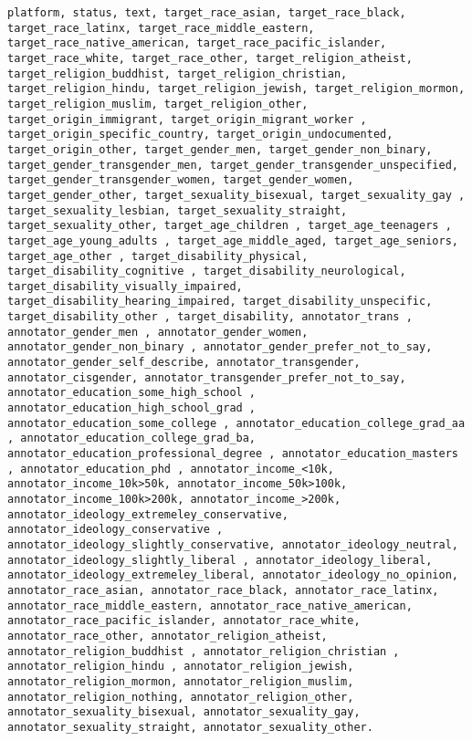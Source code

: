 \documentclass[
]{article}
\begin{document}
\begin{verbatim}
platform, status, text, target_race_asian, target_race_black, target_race_latinx, target_race_middle_eastern, target_race_native_american, target_race_pacific_islander, target_race_white, target_race_other, target_religion_atheist, target_religion_buddhist, target_religion_christian, target_religion_hindu, target_religion_jewish, target_religion_mormon, target_religion_muslim, target_religion_other, target_origin_immigrant, target_origin_migrant_worker , target_origin_specific_country, target_origin_undocumented, target_origin_other, target_gender_men, target_gender_non_binary, target_gender_transgender_men, target_gender_transgender_unspecified, target_gender_transgender_women, target_gender_women, target_gender_other, target_sexuality_bisexual, target_sexuality_gay , target_sexuality_lesbian, target_sexuality_straight, target_sexuality_other, target_age_children , target_age_teenagers , target_age_young_adults , target_age_middle_aged, target_age_seniors, target_age_other , target_disability_physical, target_disability_cognitive , target_disability_neurological, target_disability_visually_impaired, target_disability_hearing_impaired, target_disability_unspecific, target_disability_other , target_disability, annotator_trans , annotator_gender_men , annotator_gender_women, annotator_gender_non_binary , annotator_gender_prefer_not_to_say, annotator_gender_self_describe, annotator_transgender, annotator_cisgender, annotator_transgender_prefer_not_to_say, annotator_education_some_high_school , annotator_education_high_school_grad , annotator_education_some_college , annotator_education_college_grad_aa , annotator_education_college_grad_ba, annotator_education_professional_degree , annotator_education_masters , annotator_education_phd , annotator_income_<10k, annotator_income_10k>50k, annotator_income_50k>100k, annotator_income_100k>200k, annotator_income_>200k, annotator_ideology_extremeley_conservative, annotator_ideology_conservative , annotator_ideology_slightly_conservative, annotator_ideology_neutral, annotator_ideology_slightly_liberal , annotator_ideology_liberal, annotator_ideology_extremeley_liberal, annotator_ideology_no_opinion, annotator_race_asian, annotator_race_black, annotator_race_latinx, annotator_race_middle_eastern, annotator_race_native_american, annotator_race_pacific_islander, annotator_race_white, annotator_race_other, annotator_religion_atheist, annotator_religion_buddhist , annotator_religion_christian , annotator_religion_hindu , annotator_religion_jewish, annotator_religion_mormon, annotator_religion_muslim, annotator_religion_nothing, annotator_religion_other, annotator_sexuality_bisexual, annotator_sexuality_gay, annotator_sexuality_straight, annotator_sexuality_other.
\end{verbatim}
\end{document}
